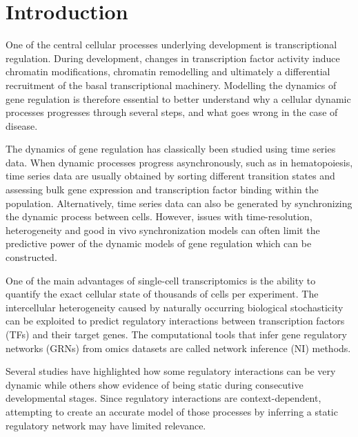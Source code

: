 
\section{Introduction}

One of the central cellular processes underlying development is transcriptional regulation. During development, changes in transcription factor activity induce chromatin modifications, chromatin remodelling and ultimately a differential recruitment of the basal transcriptional machinery\cite{coulon_eukaryotictranscriptionaldynamics_2013}. Modelling the dynamics of gene regulation is therefore essential to better understand why a cellular dynamic processes progresses through several steps, and what goes wrong in the case of disease.

The dynamics of gene regulation has classically been studied using time series data\cite{bar-joseph_studyingmodellingdynamic_2012}. When dynamic processes progress asynchronously, such as in hematopoiesis, time series data are usually obtained by sorting different transition states and assessing bulk gene expression and transcription factor binding within the population\cite{novershtern_denselyinterconnectedtranscriptional_2011, may_dynamicanalysisgene_2013, jojic_identificationtranscriptionalregulators_2013, goode_dynamicgeneregulatory_2016}. Alternatively, time series data can also be generated by synchronizing the dynamic process between cells. However, issues with time-resolution, heterogeneity and good in vivo synchronization models can often limit the predictive power of the dynamic models of gene regulation which can be constructed\cite{bar-joseph_studyingmodellingdynamic_2012}.

One of the main advantages of single-cell transcriptomics is the ability to quantify the exact cellular state of thousands of cells per experiment. The intercellular heterogeneity caused by naturally occurring biological stochasticity \cite{padovan-merhar_usingvariabilitygene_2013} can be exploited to predict regulatory interactions between transcription factors (TFs) and their target genes. The computational tools that infer gene regulatory networks (GRNs) from omics datasets are called network inference (NI) methods.

Several studies have highlighted how some regulatory interactions can be very dynamic while others show evidence of being static during consecutive developmental stages\cite{moignard_characterizationtranscriptionalnetworks_2013, pina_singlecellnetworkanalysis_2015}. 
Since regulatory interactions are context-dependent\cite{papp_genomewideanalysiscontextdependence_2005}, attempting to create an accurate model of those processes by inferring a static regulatory network may have limited relevance.

